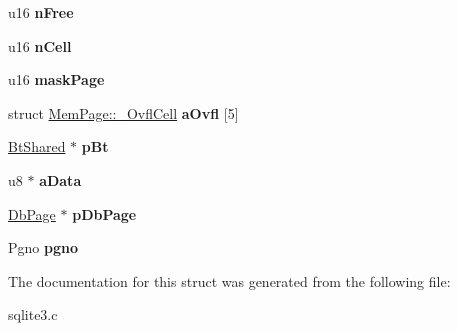 \begin{DoxyCompactItemize}
\item 
\hypertarget{struct_mem_page_a3418a9aee707f57a73d8470f8a1228a8}{u16 {\bfseries n\-Free}}\label{struct_mem_page_a3418a9aee707f57a73d8470f8a1228a8}

\item 
\hypertarget{struct_mem_page_a35d1d8f836201b82b1eb778ce0e324f4}{u16 {\bfseries n\-Cell}}\label{struct_mem_page_a35d1d8f836201b82b1eb778ce0e324f4}

\item 
\hypertarget{struct_mem_page_aa3d64e8755cc9f431bbc8423a2b506ec}{u16 {\bfseries mask\-Page}}\label{struct_mem_page_aa3d64e8755cc9f431bbc8423a2b506ec}

\item 
\hypertarget{struct_mem_page_a4ac8901d1b123395f2abf3cc60105586}{struct \hyperlink{struct_mem_page_1_1___ovfl_cell}{Mem\-Page\-::\-\_\-\-Ovfl\-Cell} {\bfseries a\-Ovfl} \mbox{[}5\mbox{]}}\label{struct_mem_page_a4ac8901d1b123395f2abf3cc60105586}

\item 
\hypertarget{struct_mem_page_a949df1156f7392592eaeb64389068f99}{\hyperlink{struct_bt_shared}{Bt\-Shared} $\ast$ {\bfseries p\-Bt}}\label{struct_mem_page_a949df1156f7392592eaeb64389068f99}

\item 
\hypertarget{struct_mem_page_a2d873eff563d2208be0c24959140a4b0}{u8 $\ast$ {\bfseries a\-Data}}\label{struct_mem_page_a2d873eff563d2208be0c24959140a4b0}

\item 
\hypertarget{struct_mem_page_add322c1aed91e95d8dfe3ac3535d65b4}{\hyperlink{struct_pg_hdr}{Db\-Page} $\ast$ {\bfseries p\-Db\-Page}}\label{struct_mem_page_add322c1aed91e95d8dfe3ac3535d65b4}

\item 
\hypertarget{struct_mem_page_ad2b0c532abc799bbcf3b43df4f0b0546}{Pgno {\bfseries pgno}}\label{struct_mem_page_ad2b0c532abc799bbcf3b43df4f0b0546}

\end{DoxyCompactItemize}


The documentation for this struct was generated from the following file\-:\begin{DoxyCompactItemize}
\item 
sqlite3.\-c\end{DoxyCompactItemize}

